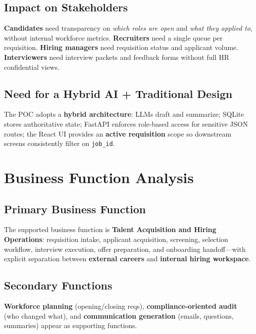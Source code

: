 \documentclass[12pt]{article}
\begin{document}
\subsection{Impact on Stakeholders}

\textbf{Candidates} need transparency on \textit{which roles are open} and \textit{what they applied to}, without internal workforce metrics. \textbf{Recruiters} need a single queue per requisition. \textbf{Hiring managers} need requisition status and applicant volume. \textbf{Interviewers} need interview packets and feedback forms without full HR confidential views.

\subsection{Need for a Hybrid AI + Traditional Design}

The POC adopts a \textbf{hybrid architecture}: LLMs draft and summarize; SQLite stores authoritative state; FastAPI enforces role-based access for sensitive JSON routes; the React UI provides an \textbf{active requisition} scope so downstream screens consistently filter on \texttt{job\_id}.

\section{Business Function Analysis}
\label{sec:businessfn}

\subsection{Primary Business Function}

The supported business function is \textbf{Talent Acquisition and Hiring Operations}: requisition intake, applicant acquisition, screening, selection workflow, interview execution, offer preparation, and onboarding handoff---with explicit separation between \textbf{external careers} and \textbf{internal hiring workspace}.

\subsection{Secondary Functions}

\textbf{Workforce planning} (opening/closing reqs), \textbf{compliance-oriented audit} (who changed what), and \textbf{communication generation} (emails, questions, summaries) appear as supporting functions.
\end{document}
